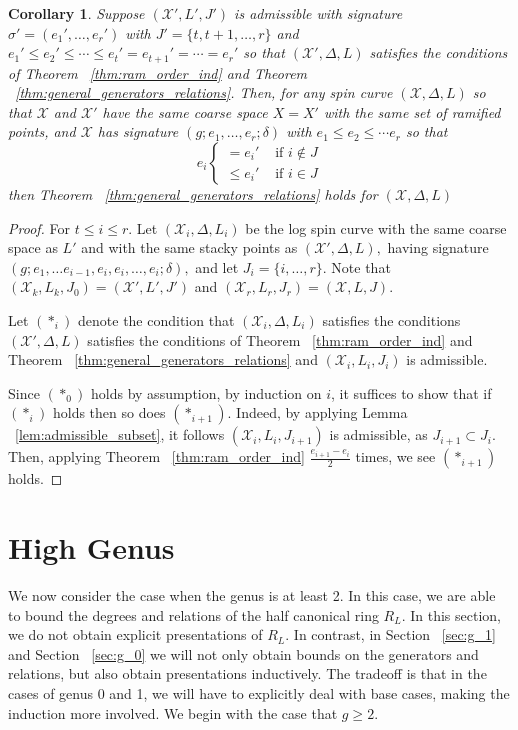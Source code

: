 \documentclass{amsart}
\theoremstyle{plain}
\newtheorem{cor}[thm]{Corollary}
\theoremstyle{definition}
\theoremstyle{remark}
\numberwithin{equation}{section}
\newcommand \sx{\mathscr X}
\begin{document}
\begin{cor}
\label{cor:raise-stacky-order}
Suppose $(\sx',L',J')$ is admissible with signature $\sigma' = (e_1',\ldots,e_r')$ with $J' = \{t,t+1,\ldots,r\}$ and $e_1' \leq e_2' \leq \cdots \leq e_t' = e_{t+1}' =\cdots = e_r'$
so that $(\sx',\Delta, L)$ satisfies the conditions of Theorem ~\ref{thm:ram_order_ind} and Theorem ~\ref{thm:general_generators_relations}. Then, for any spin curve $(\sx,\Delta,L)$ so that $\sx$ and $\sx'$ have the same coarse space $X = X'$ with the same set of ramified points, and $\sx$ has signature $(g;e_1,\ldots, e_r;\delta)$ with $e_1 \leq e_2 \leq \cdots e_r$ so that
$$
e_i \begin{cases}
	= e_i' &\text{ if }i \notin J\\
	\leq e_i' &\text{ if } i \in J
\end{cases}$$
then Theorem ~\ref{thm:general_generators_relations} holds for $(\sx,\Delta,L)$
\end{cor}
\begin{proof}
For $t \leq i \leq r$. Let $(\sx_i,\Delta, L_i)$ be the log spin curve with the same coarse space as $L'$ and with the same stacky points as $(\sx',\Delta,L),$ having signature $(g;e_1, \ldots e_{i-1}, e_i, e_i, \ldots, e_i;\delta),$ and let 
$J_i = \{i,\ldots, r\}.$ Note that $(\sx_k,L_k,J_0) = (\sx',L',J')$ and $(\sx_r ,L_r ,J_r) = (\sx, L, J)$.

Let $(*_i)$ denote the condition that $(\sx_i,\Delta, L_i)$ satisfies the conditions $(\sx',\Delta, L)$ satisfies the conditions of Theorem ~\ref{thm:ram_order_ind} and Theorem ~\ref{thm:general_generators_relations} and $(\sx_i, L_i, J_i)$ is admissible.

Since $(*_0)$ holds by assumption, by induction on $i$, it suffices to show that if $(*_i)$ holds then so does $(*_{i+1}).$ 
Indeed, by applying Lemma ~\ref{lem:admissible_subset}, it follows $(\sx_i, L_i, J_{i+1})$ is admissible, as $J_{i+1} \subset J_i$. Then, applying Theorem ~\ref{thm:ram_order_ind} $\frac{e_{i+1}-e_i}{2}$ times, we see $(*_{i+1})$ holds.
\end{proof}


\section{High Genus}
\label{sec:g_high}
We now consider the case when the genus is at least 2. In this case, we are able to bound the degrees and relations of the half canonical ring $R_L$. In this section, we do not obtain explicit presentations of $R_L.$ In contrast, in Section ~\ref{sec:g_1} and Section ~\ref{sec:g_0} we will not only obtain bounds on the generators and relations, but also obtain presentations inductively. The tradeoff is that in the cases of genus 0 and 1, we will have to explicitly deal with base cases, making the induction more involved. We begin with the case that $g \geq 2$.
\end{document}
